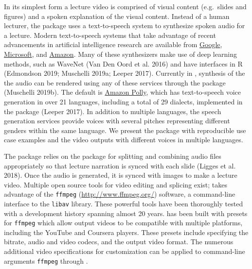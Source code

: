 In its simplest form a lecture video is comprised of visual content
(e.g.~slides and figures) and a spoken explanation of the visual
content. Instead of a human lecturer, the  package uses a
text-to-speech system to synthesize spoken audio for a lecture. Modern
text-to-speech systems that take advantage of recent advancements in
artificial intelligence research are available from
\href{https://cloud.google.com/text-to-speech/}{Google},
\href{https://azure.microsoft.com/en-us/services/cognitive-services/text-to-speech/}{Microsoft},
and \href{https://aws.amazon.com/polly/}{Amazon}. Many of these
synthesizers make use of deep learning methods, such as WaveNet (Van Den
Oord et al. 2016) and have interfaces in R (Edmondson 2019; Muschelli
2019a; Leeper 2017). Currently in , synthesis of the the audio
can be rendered using any of these services through the
 package (Muschelli 2019b). The default is
\href{https://aws.amazon.com/polly/}{Amazon Polly}, which has
text-to-speech voice generation in over 21 languages, including a total
of 29 dialects, implemented in the  package (Leeper
2017). In addition to multiple languages, the speech generation services
provide voices with several pitches representing different genders
within the same language. We present the  package with
reproducible use case examples and the video outputs with different
voices in multiple languages.

The  package relies on the  package for
splitting and combining audio files appropriately so that lecture
narration is synced with each slide (Ligges et al. 2018). Once the audio
is generated, it is synced with images to make a lecture video. Multiple
open source tools for video editing and splicing exist;  takes
advantage of the \texttt{ffmpeg} (\url{http://www.ffmpeg.org/})
software, a command-line interface to the \texttt{libav} library. These
powerful tools have been thoroughly tested with a development history
spanning almost 20 years.  has been built with presets for
\texttt{ffmpeg} which allow output videos to be compatible with multiple
platforms, including the YouTube and Coursera players. These presets
include specifying the bitrate, audio and video codecs, and the output
video format. The numerous additional video specifications for
customization can be applied to command-line arguments \texttt{ffmpeg}
through .

